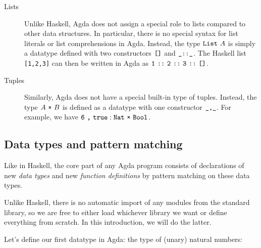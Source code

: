 \documentclass[a4paper,UKenglish]{tufte-handout}
\theoremstyle{definition}
\newcommand\data[1]{{\AgdaFunction{#1}}}
\newcommand\con[1]{{\AgdaInductiveConstructor{#1}}}
\newcommand\lit[1]{{\AgdaNumber{#1}}}
\newcommand\Nat{\data{Nat}}
\newcommand\Bool{\data{Bool}}
\begin{document}
\begin{description}
\item[Lists] Unlike Haskell, Agda does not assign a special role to lists
compared to other data structures. In particular, there is no special syntax
for list literals or list comprehensions in Agda. Instead, the type
$\data{List}\ A$ is simply a datatype defined with two constructors $\con{[]}$
and $\con{\_::\_}$. The Haskell list \texttt{[1,2,3]} can then be written in
Agda as $\lit{1}\ \con{::}\ \lit{2}\ \con{::}\ \lit{3}\ \con{::}\ \con{[]}$.

\item[Tuples] Similarly, Agda does not have a special built-in type of tuples.
Instead, the type $A\ \data{×}\ B$ is defined as a datatype with one
constructor $\con{\_,\_}$. For example, we have $\lit{6}\ \con{,}\ \con{true} : \Nat\
\data{×}\ \Bool$.


\end{description}

\subsection{Data types and pattern matching}

Like in Haskell, the core part of any Agda program consists of declarations of
new \emph{data types} and new \emph{function definitions} by pattern
matching on these data types.

Unlike Haskell, there is no automatic import of any modules from the standard
library, so we are free to either load whichever library we want or define
everything from scratch. In this introduction, we will do the latter.

Let's define our first datatype in Agda: the type of (unary) natural numbers:
\end{document}
